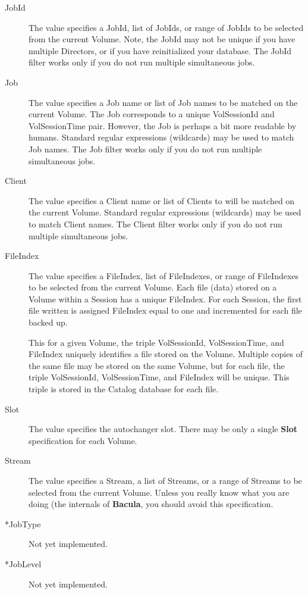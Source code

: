 \begin{description}
\item [JobId]
   The value specifies a JobId, list of JobIds, or range of JobIds  to be
selected from the current Volume. Note, the JobId may not be  unique if you
have multiple Directors, or if you have reinitialized your  database. The
JobId filter works only if you do not run  multiple simultaneous jobs.  

\item [Job]
   The value specifies a Job name or list of Job names to  be matched on the
current Volume. The Job corresponds to a unique  VolSessionId and
VolSessionTime pair. However, the Job is perhaps a  bit more readable by
humans. Standard regular expressions (wildcards)  may be used to match Job
names. The Job filter works only if you do  not run multiple simultaneous
jobs.  

\item [Client]
   The value specifies a Client name or list of Clients to  will be matched on
the current Volume. Standard regular expressions  (wildcards) may be used to
match Client names. The Client filter works  only if you do not run multiple
simultaneous jobs.  

\item [FileIndex]
   The value specifies a FileIndex, list of FileIndexes,  or range of FileIndexes
to be selected from the current Volume.  Each file (data) stored on a Volume
within a Session has a unique  FileIndex. For each Session, the first file
written is assigned  FileIndex equal to one and incremented for each file
backed up.  

This for a given Volume, the triple VolSessionId, VolSessionTime,  and
FileIndex uniquely identifies a file stored on the Volume. Multiple  copies of
the same file may be stored on the same Volume, but for  each file, the triple
VolSessionId, VolSessionTime, and FileIndex  will be unique. This triple is
stored in the Catalog database for  each file.  

\item [Slot]
   The value specifies the autochanger slot. There may  be only a single {\bf
Slot} specification for each Volume.  

\item [Stream]
   The value specifies a Stream, a list of Streams,  or a range of Streams to be
selected from the current Volume.  Unless you really know what you are doing
(the internals of  {\bf Bacula}, you should avoid this specification.  

\item [*JobType]
   Not yet implemented.  

\item [*JobLevel]
   Not yet implemented.  
\end{description}

